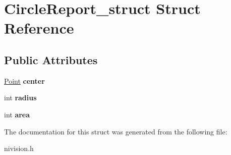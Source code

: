 \hypertarget{structCircleReport__struct}{
\section{CircleReport\_\-struct Struct Reference}
\label{structCircleReport__struct}
}
\subsection*{Public Attributes}
\begin{DoxyCompactItemize}
\item 
\hypertarget{structCircleReport__struct_a8434fb4cd934d0685cc8ccb8a179a573}{
\hyperlink{structPoint__struct}{Point} {\bfseries center}}
\label{structCircleReport__struct_a8434fb4cd934d0685cc8ccb8a179a573}

\item 
\hypertarget{structCircleReport__struct_a06d89c26bdad438e7d7097638e2bda80}{
int {\bfseries radius}}
\label{structCircleReport__struct_a06d89c26bdad438e7d7097638e2bda80}

\item 
\hypertarget{structCircleReport__struct_a1905ca1daa64ff0d6a25ee66d7851d8f}{
int {\bfseries area}}
\label{structCircleReport__struct_a1905ca1daa64ff0d6a25ee66d7851d8f}

\end{DoxyCompactItemize}


The documentation for this struct was generated from the following file:\begin{DoxyCompactItemize}
\item 
nivision.h\end{DoxyCompactItemize}
